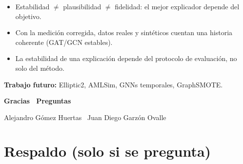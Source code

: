 \documentclass[aspectratio=169,11pt]{beamer}
\begin{document}
{
\begin{frame}
\vspace{0.3cm}\par
\hspace*{0.4cm}{\color{amber}\rule{1cm}{2.5pt}}\par\vspace{8pt}
\par\vspace{10pt}
\hspace*{0.4cm}\begin{minipage}{0.9\textwidth}
{\color{white}\small
\begin{itemize}
  \item Estabilidad $\neq$ plausibilidad $\neq$ fidelidad: el mejor explicador depende del objetivo.
  \item Con la medición corregida, datos reales y sintéticos cuentan una historia coherente (GAT/GCN estables).
  \item La estabilidad de una explicación depende del protocolo de evaluación, no solo del método.
\end{itemize}}
\vspace{4pt}\par
{\color{white!85}\small \textbf{Trabajo futuro:} Elliptic2, AMLSim, GNNs temporales, GraphSMOTE.}
\end{minipage}\par\vspace{16pt}
\begin{center}
{\color{white}\Large\bfseries Gracias \textperiodcentered\ Preguntas}\par\vspace{3pt}
{\color{white!80}\small Alejandro Gómez Huertas \textperiodcentered\ Juan Diego Garzón Ovalle}
\end{center}
\end{frame}}

\appendix
\section{Respaldo (solo si se pregunta)}
\end{document}

